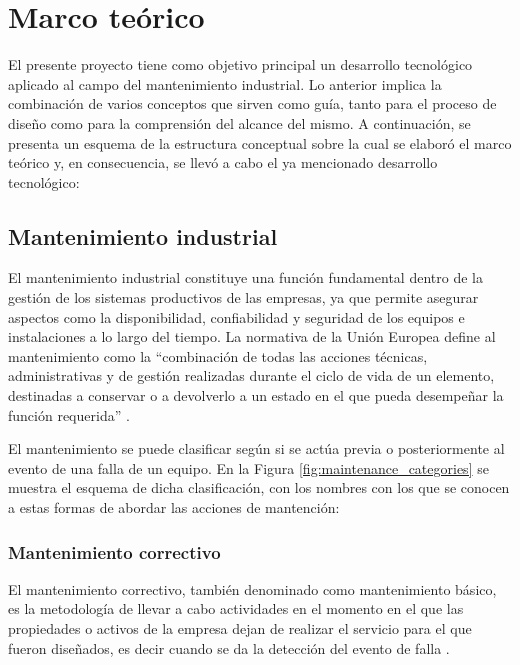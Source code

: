 \section{Marco teórico}

    El presente proyecto tiene como objetivo principal un desarrollo tecnológico aplicado al campo del mantenimiento industrial. Lo anterior implica la combinación de varios conceptos que sirven como guía, tanto para el proceso de diseño como para la comprensión del alcance del mismo. A continuación, se presenta un esquema de la estructura conceptual sobre la cual se elaboró el marco teórico y, en consecuencia, se llevó a cabo el ya mencionado desarrollo tecnológico:

    

    \subsection{Mantenimiento industrial}

        El mantenimiento industrial constituye una función fundamental dentro de la gestión de los sistemas productivos de las empresas, ya que permite asegurar aspectos como la disponibilidad, confiabilidad y seguridad de los equipos e instalaciones a lo largo del tiempo. La normativa de la Unión Europea define al mantenimiento como la “combinación de todas las acciones técnicas, administrativas y de gestión realizadas durante el ciclo de vida de un elemento, destinadas a conservar o a devolverlo a un estado en el que pueda desempeñar la función requerida” \parencite[p. 6]{UNE:2018}.

        El mantenimiento se puede clasificar según si se actúa previa o posteriormente al evento de una falla de un equipo. En la Figura \ref{fig:maintenance_categories} se muestra el esquema de dicha clasificación, con los nombres con los que se conocen a estas formas de abordar las acciones de mantención:

        

        \subsubsection{Mantenimiento correctivo}

            El mantenimiento correctivo, también denominado como mantenimiento básico, es la metodología de llevar a cabo actividades en el momento en el que las propiedades o activos de la empresa dejan de realizar el servicio para el que fueron diseñados, es decir cuando se da la detección del evento de falla \parencite{MEDRANO:2017}.

